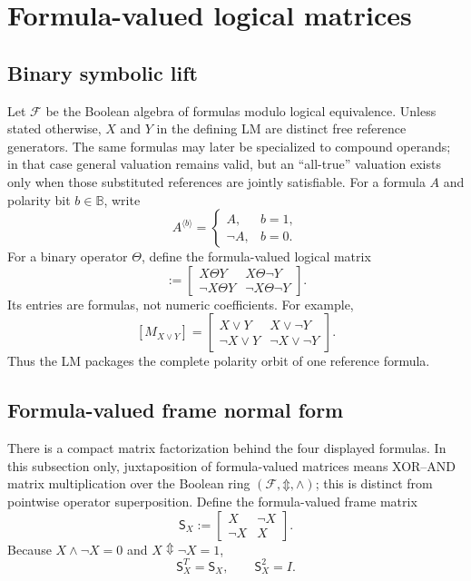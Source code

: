 \documentclass[11pt]{article}
\theoremstyle{definition}
\theoremstyle{remark}
\newcommand{\B}{\mathbb B}
\newcommand{\cF}{\mathcal F}
\newcommand{\xor}{\mathbin{\Updownarrow}}
\begin{document}
\section{Formula-valued logical matrices}
\label{sec:lm}

\subsection{Binary symbolic lift}

Let $\cF$ be the Boolean algebra of formulas modulo logical equivalence.  Unless stated otherwise, $X$ and $Y$ in the defining LM are distinct free reference generators.  The same formulas may later be specialized to compound operands; in that case general valuation remains valid, but an ``all-true'' valuation exists only when those substituted references are jointly satisfiable.  For a formula $A$ and polarity bit $b\in\B$, write
\begin{equation}
 A^{\langle b\rangle}=\begin{cases}A,&b=1,\\\neg A,&b=0.\end{cases}
 \label{eq:polarity}
\end{equation}
For a binary operator $\Theta$, define the formula-valued logical matrix
\begin{equation}
 [M_{X\Theta Y}]:=
 \begin{bmatrix}
 X\Theta Y&X\Theta\neg Y\\
 \neg X\Theta Y&\neg X\Theta\neg Y
 \end{bmatrix}.
 \label{eq:binarylm}
\end{equation}
Its entries are formulas, not numeric coefficients.  For example,
\[
 [M_{X\lor Y}]=
 \begin{bmatrix}
 X\lor Y&X\lor\neg Y\\
 \neg X\lor Y&\neg X\lor\neg Y
 \end{bmatrix}.
\]
Thus the LM packages the complete polarity orbit of one reference formula.

\subsection{Formula-valued frame normal form}

There is a compact matrix factorization behind the four displayed formulas.  In this subsection only, juxtaposition of formula-valued matrices means XOR--AND matrix multiplication over the Boolean ring $(\cF,\xor,\land)$; this is distinct from pointwise operator superposition.
Define the formula-valued frame matrix
\begin{equation}
 \mathsf S_X:=
 \begin{bmatrix}
 X&\neg X\\
 \neg X&X
 \end{bmatrix}.
 \label{eq:frameSX}
\end{equation}
Because $X\land\neg X=0$ and $X\xor\neg X=1$,
\begin{equation}
 \mathsf S_X^T=\mathsf S_X,
 \qquad
 \mathsf S_X^2=I.
 \label{eq:frameinvolution}
\end{equation}
\end{document}
